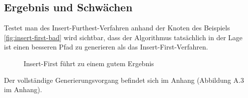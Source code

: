 \subsection{Ergebnis und Schwächen}
Testet man des Insert-Furthest-Verfahren anhand der Knoten des Beispiels \vref{fig:insert-first-bad} wird sichtbar, dass der Algorithmus tatsächlich in der Lage ist einen besseren Pfad zu generieren als das Insert-First-Verfahren.

\begin{figure}[H]
    \begin{center}
        \hfil
        \caption{Insert-First führt zu einem gutem Ergebnis}
        \label{fig:insert-furthest-good}
    \end{center}
\end{figure}
Der vollständige Generierungsvorgang befindet sich im Anhang (Abbildung A.3 im Anhang). \\


